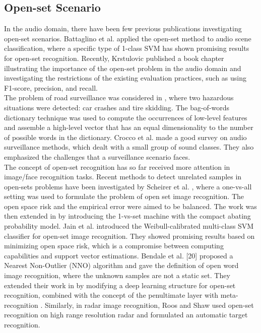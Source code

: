 \documentclass{ieeeaccess}
\begin{document}
\subsection{Open-set Scenario} \label{subsec:openscen} 
In the audio domain, there have been few previous publications investigating open-set scenarios. Battaglino et al. \cite{16} applied the open-set method to audio scene classification, where a specific type of 1-class SVM has shown promising results for open-set recognition. Recently, Krstulovic \cite{17} published a book chapter illustrating the importance of the open-set problem in the audio domain and investigating the restrictions of the existing evaluation practices, such as using F1-score, precision, and recall. \\
The problem of road surveillance was considered in \cite{8}, where two hazardous situations were detected: car crashes and tire skidding. The bag-of-words dictionary technique was used to compute the occurrences of low-level features and assemble a high-level vector that has an equal dimensionality to the number of possible words in the dictionary. Crocco et al. \cite{18} made a good survey on audio surveillance methods, which dealt with a small group of sound classes. They also emphasized the challenges that a surveillance scenario faces.\\
The concept of open-set recognition has so far received more attention in image/face recognition tasks. Recent methods to detect unrelated samples in open-sets problems have been investigated by Scheirer et al. \cite{2}, where a one-vs-all setting was used to formulate the problem of open set image recognition.  The open space risk and the empirical error were aimed to be balanced. The work was then extended in \cite{3} by introducing the 1-vs-set machine with the compact abating probability model. Jain et al. \cite{19} introduced the Weibull-calibrated multi-class SVM classifier for open-set image recognition. They showed promising results based on minimizing open space risk, which is a compromise between computing capabilities and support vector estimations. Bendale et al. [20] proposed a Nearest Non-Outlier (NNO) algorithm and gave the definition of open word image recognition, where the unknown samples are not a static set. They extended their work in \cite{21} by modifying a deep learning structure for open-set recognition, combined with the concept of the penultimate layer with meta-recognition \cite{22}. Similarly, in radar image recognition, Roos and Shaw \cite{23} used open-set recognition on high range resolution radar and formulated an automatic target recognition. \\
\end{document}
